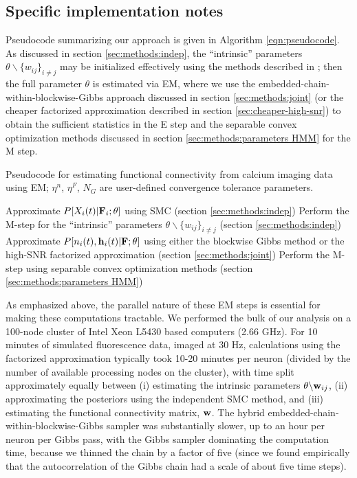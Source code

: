\subsection{Specific implementation notes} \label{sec:methods:specific_implementation}

Pseudocode summarizing our approach is given in Algorithm
\ref{eqn:pseudocode}.  As discussed in section
\ref{sec:methods:indep}, the ``intrinsic'' parameters $\theta
\backslash \{w_{ij}\}_{i \neq j}$ may be initialized effectively using
the methods described in \cite{Vogelstein2009}; then the full
parameter $\theta$ is estimated via EM, where we use the
embedded-chain-within-blockwise-Gibbs approach discussed in section
\ref{sec:methods:joint} (or the cheaper factorized approximation
described in section \ref{sec:cheaper-high-snr}) to obtain the
sufficient statistics in the E step and the separable convex
optimization methods discussed in section \ref{sec:methods:parameters
HMM} for the M step.

\begin{algorithm}[t!]
\caption{Pseudocode for estimating functional connectivity from
calcium imaging data using EM; $\eta^n$, $\eta^F$, $N_G$ are
user-defined convergence tolerance parameters.}
\label{eqn:pseudocode}
\begin{algorithmic}
      \State Approximate $P[X_i(t)|{\bf F}_i; \mathbf{\theta}]$ using SMC (section
  \ref{sec:methods:indep})
      \State Perform the M-step for the ``intrinsic'' parameters
  $\theta \backslash \{w_{ij}\}_{i \neq j}$ (section
  \ref{sec:methods:indep})  
    \EndWhile
  \EndFor
      \State Approximate $P[n_i(t), \mathbf{h}_i(t) |{\bf F}; \mathbf{\theta}]$ using
  either the blockwise Gibbs method or the high-SNR
  factorized approximation (section \ref{sec:methods:joint})
    \EndFor
  	\State Perform the M-step using separable convex optimization
  methods (section \ref{sec:methods:parameters HMM})  
  \EndFor
\EndWhile
\end{algorithmic}
\end{algorithm}

As emphasized above, the parallel nature of these EM steps is
essential for making these computations tractable. We performed the
bulk of our analysis on a 100-node cluster of Intel Xeon L5430 based
computers (2.66 GHz). For 10 minutes of simulated fluorescence data,
imaged at $30$ Hz, calculations using the factorized approximation
typically took 10-20 minutes per neuron (divided by the number of
available processing nodes on the cluster), with time split
approximately equally between (i) estimating the intrinsic parameters
$\theta \backslash \mathbf{w}_{ij}$, (ii) approximating the posteriors using
the independent SMC method, and (iii) estimating the functional
connectivity matrix, $\mathbf{w}$.  The hybrid
embedded-chain-within-blockwise-Gibbs sampler was substantially
slower, up to an hour per neuron per Gibbs pass, with the Gibbs
sampler dominating the computation time, because we thinned the chain
by a factor of five (since we found empirically that the
autocorrelation of the Gibbs chain had a scale of about five time
steps).

